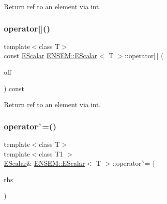 Return ref to an element via int. 

\mbox{\label{classENSEM_1_1EScalar_a20c80375941641aca36355253b3479ac}} 
\subsubsection{\texorpdfstring{operator[]()}{operator[]()}\hspace{0.1cm}{\footnotesize\ttfamily [2/2]}}
{\footnotesize\ttfamily template$<$class T$>$ \\
const \mbox{\hyperlink{classENSEM_1_1EScalar}{E\+Scalar}} \mbox{\hyperlink{classENSEM_1_1EScalar}{E\+N\+S\+E\+M\+::\+E\+Scalar}}$<$ T $>$\+::operator\mbox{[}$\,$\mbox{]} (\begin{DoxyParamCaption}\item[{int}]{off }\end{DoxyParamCaption}) const\hspace{0.3cm}{\ttfamily [inline]}}



Return ref to an element via int. 

\mbox{\label{classENSEM_1_1EScalar_a42c2a63d2eda81643ae8145068db3a8e}} 
\subsubsection{\texorpdfstring{operator$^\wedge$=()}{operator^=()}\hspace{0.1cm}{\footnotesize\ttfamily [1/2]}}
{\footnotesize\ttfamily template$<$class T$>$ \\
template$<$class T1 $>$ \\
\mbox{\hyperlink{classENSEM_1_1EScalar}{E\+Scalar}}\& \mbox{\hyperlink{classENSEM_1_1EScalar}{E\+N\+S\+E\+M\+::\+E\+Scalar}}$<$ T $>$\+::operator$^\wedge$= (\begin{DoxyParamCaption}\item[{const \mbox{\hyperlink{classENSEM_1_1EScalar}{E\+Scalar}}$<$ T1 $>$ \&}]{rhs }\end{DoxyParamCaption})\hspace{0.3cm}{\ttfamily [inline]}}



